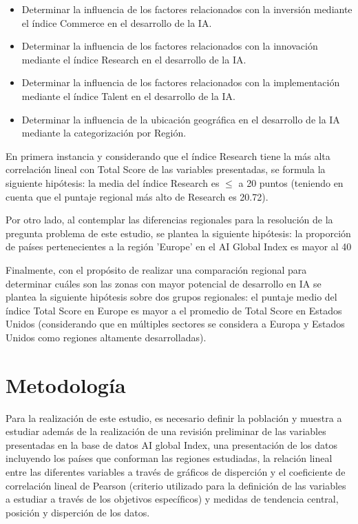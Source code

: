 \documentclass[
]{article}
\begin{document}
\begin{multicols}{2}
\begin{itemize}
\item Determinar la influencia de los factores relacionados con la inversión mediante el índice Commerce en el desarrollo de la IA.
\item Determinar la influencia de los factores relacionados con la innovación mediante el índice Research en el desarrollo de la IA.
\item Determinar la influencia de los factores relacionados con la implementación mediante el índice Talent en el desarrollo de la IA.
\item Determinar la influencia de la ubicación geográfica en el desarrollo de la IA mediante la categorización por Región.
\end{itemize}

En primera instancia y considerando que el índice Research tiene la más alta correlación lineal con Total Score de las variables presentadas, se formula la siguiente hipótesis: la media del índice Research es $≤$ a 20 puntos (teniendo en cuenta que el puntaje regional más alto de Research es 20.72).

Por otro lado, al contemplar las diferencias regionales para la resolución de la pregunta problema de este estudio, se plantea la siguiente hipótesis: la proporción de países pertenecientes a la región 'Europe' en el AI Global Index es mayor al 40%

Finalmente, con el propósito de realizar una comparación regional para determinar cuáles son las zonas con mayor potencial de desarrollo en IA se plantea la siguiente hipótesis sobre dos grupos regionales: el puntaje medio del índice Total Score en Europe es mayor a el promedio de Total Score en Estados Unidos (considerando que en múltiples sectores se considera a Europa y Estados Unidos como regiones altamente desarrolladas).




\section{Metodología}

Para la realización de este estudio, es necesario definir la población y muestra a estudiar además de la realización de una revisión preliminar de las variables presentadas en la base de datos AI global Index, una presentación de los datos incluyendo los países que conforman las regiones estudiadas, la relación lineal entre las diferentes variables a través de gráficos de disperción y el coeficiente de correlación lineal de Pearson (criterio utilizado para la definición de las variables a estudiar a través de los objetivos específicos) y medidas de tendencia central, posición y disperción de los datos.


\end{multicols}
\end{document}
